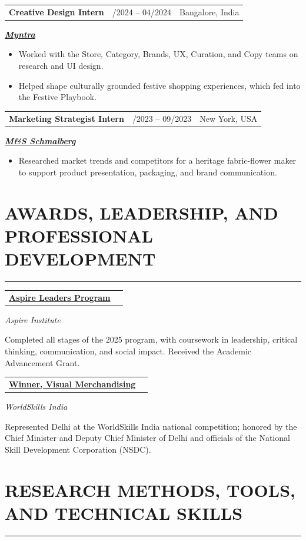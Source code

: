 \documentclass[10pt,letterpaper]{article}
\makeatletter
\newcommand{\weblink}[2]{\href{#1}{\textbf{#2}}}
\newcommand{\sectionrule}{\par\vspace{-2pt}\noindent\rule{\linewidth}{0.4pt}\par\vspace{2pt}}
\newcommand{\body}[1]{{\setlength{\rightskip}{2.7em}#1\par}}
\newenvironment{spread}[2][\normalsize]{\par\begingroup\linespread{#2}#1\selectfont}{\par\endgroup}
\newcommand{\entry}[2]{%
  \par\noindent
  \begin{tabularx}{\linewidth}{@{}X r@{}}
    \textbf{#1} & \normalfont #2
  \end{tabularx}\par
}
\newcommand{\entrygap}{\vspace{5pt}}
\newcommand{\subline}[1]{{\setlength{\rightskip}{2.7em}\itshape\small #1\par}\vspace{1pt}}
\makeatother
\begin{document}
\begin{spread}{1.03}
\begin{spread}{1.07}
\entrygap
{}
\entry{Creative Design Intern}{01/2024 -- 04/2024~\textbar\ Bangalore, India}
\subline{\weblink{https://www.myntra.com/}{Myntra}}
\begin{itemize}
  \item Worked with the Store, Category, Brands, UX, Curation, and Copy teams on research and UI design.
  \item Helped shape culturally grounded festive shopping experiences, which fed into the Festive Playbook.
\end{itemize}

\entrygap
{}
\entry{Marketing Strategist Intern}{06/2023 -- 09/2023~\textbar\ New York, USA}
\subline{\weblink{https://customfabricflowers.com/}{M\&S Schmalberg}}
\begin{itemize}
  \item Researched market trends and competitors for a heritage fabric-flower maker to support product presentation, packaging, and brand communication.
\end{itemize}

\section{\MakeUppercase{Awards, Leadership, and Professional Development}}
\sectionrule

\entry{\weblink{https://linkedin.com/in/hiamritaa}{Aspire Leaders Program}}{2025}
\subline{Aspire Institute}
\body{Completed all stages of the 2025 program, with coursework in leadership, critical thinking, communication, and social impact. Received the Academic Advancement Grant.}

\entrygap
{}
\entry{\weblink{https://worldskills.org/skills/id/336/}{Winner, Visual Merchandising}}{2021}
\subline{WorldSkills India}
\body{Represented Delhi at the WorldSkills India national competition; honored by the Chief Minister and Deputy Chief Minister of Delhi and officials of the National Skill Development Corporation (NSDC).}

\section{\MakeUppercase{Research Methods, Tools, and Technical Skills}}
\sectionrule


\end{spread}
\end{spread}
\end{document}
